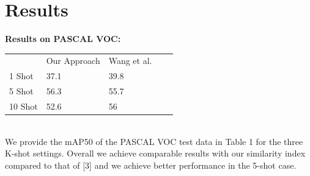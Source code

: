\documentclass{article}
\begin{document}
\section{Results}
\textbf{Results on PASCAL VOC:}\\
\begin{table}[h!]
\begin{tabular}{lllll}
        & Our Approach & Wang et al. &  &  \\
1 Shot  & 37.1         & 39.8        &  &  \\
5 Shot  & 56.3         & 55.7        &  &  \\
10 Shot & 52.6         & 56          &  & 
\end{tabular}
\end{table}\\
We provide the mAP50 of the PASCAL VOC test data in Table 1 for the three K-shot settings. Overall we achieve comparable results with our similarity index compared to that of [3] and we achieve better performance in the 5-shot case. 
\end{document}
